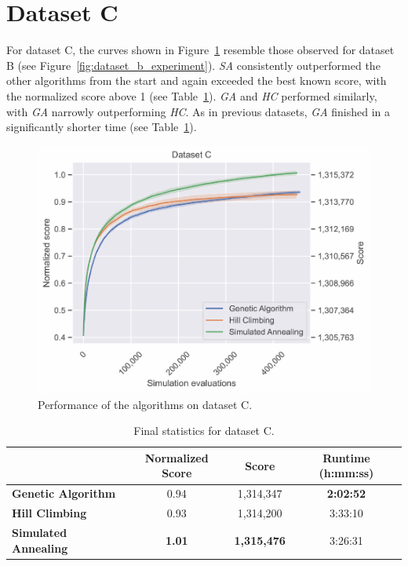 \newpage
\section{Dataset C} \label{sec:dataset_c}

For dataset C, the curves shown in Figure~\ref{fig:dataset_c_experiment} resemble those observed for dataset B (see Figure~\ref{fig:dataset_b_experiment}). \textit{SA} consistently outperformed the other algorithms from the start and again exceeded the best known score, with the normalized score above 1 (see Table~\ref{tab:dataset_c_results}). \textit{GA} and \textit{HC} performed similarly, with \textit{GA} narrowly outperforming \textit{HC}. As in previous datasets, \textit{GA} finished in a significantly shorter time (see Table~\ref{tab:dataset_c_results}).

\bigskip

\begin{figure}[h]
    \centering
    \includegraphics[width=\linewidth]{img/experiments/pdfa-c_Genetic Algorithm_Hill Climbing_Simulated Annealing.pdf}
    \caption[Performance of the algorithms on dataset C]{
        Performance of the algorithms on dataset C.
    }
    \label{fig:dataset_c_experiment}
\end{figure}

\bigskip

\begin{table}[h]
\centering\footnotesize\sf
\begin{tabular}{lccc}
\toprule
& Normalized Score & Score & Runtime (h:mm:ss) \\
\midrule
\textcolor{myblue}{\textbf{Genetic Algorithm}} & 0.94 & 1,314,347 & \textbf{2:02:52} \\
\textcolor{myorange}{\textbf{Hill Climbing}} & 0.93 & 1,314,200 & 3:33:10 \\
\textcolor{mygreen}{\textbf{Simulated Annealing}} & \textbf{1.01} & \textbf{1,315,476} & 3:26:31 \\
\bottomrule
\end{tabular}
\caption[Statistics for dataset C]{
    Final statistics for dataset C.
}
\label{tab:dataset_c_results}
\end{table}

